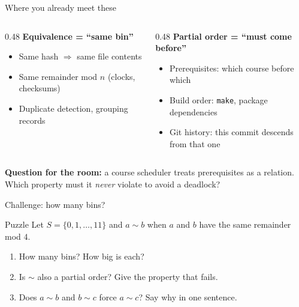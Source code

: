 \documentclass[aspectratio=169,10pt]{beamer}
\begin{document}
\begin{frame}{Where you already meet these}
\begin{columns}[T]
\begin{column}{0.48\textwidth}
\textbf{Equivalence = ``same bin''}
\begin{itemize}
\item Same hash $\Rightarrow$ same file contents
\item Same remainder mod $n$ (clocks, checksums)
\item Duplicate detection, grouping records
\end{itemize}
\end{column}
\begin{column}{0.48\textwidth}
\textbf{Partial order = ``must come before''}
\begin{itemize}
\item Prerequisites: which course before which
\item Build order: \texttt{make}, package dependencies
\item Git history: this commit descends from that one
\end{itemize}
\end{column}
\end{columns}
\vspace{6pt}
\textbf{Question for the room:} a course scheduler treats prerequisites as a relation. Which property must it \emph{never} violate to avoid a deadlock?
\end{frame}

\begin{frame}{Challenge: how many bins?}
\begin{block}{Puzzle}
Let $S=\{0,1,\dots,11\}$ and $a\sim b$ when $a$ and $b$ have the same remainder mod $4$.
\end{block}
\begin{enumerate}
\item How many bins? How big is each?
\item Is $\sim$ also a partial order? Give the property that fails.
\item Does $a\sim b$ and $b\sim c$ force $a\sim c$? Say why in one sentence.
\end{enumerate}
\end{frame}
\end{document}
